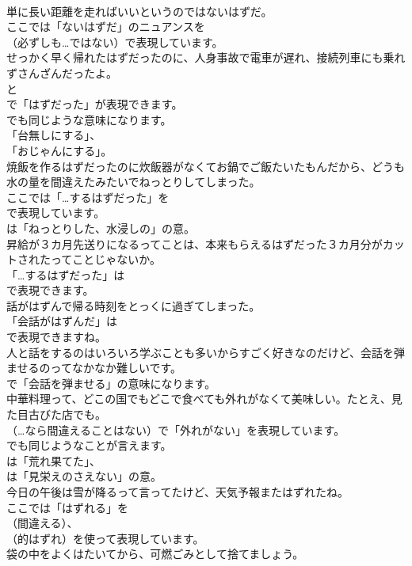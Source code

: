 \documentclass[8pt]{extreport}
\begin{document}
\begin{CJK}{UTF8}{min}
\\	単に長い距離を走ればいいというのではないはずだ。 
\\	ここでは「ないはずだ」のニュアンスを 
\\	（必ずしも…ではない）で表現しています。	
\\	せっかく早く帰れたはずだったのに、人身事故で電車が遅れ、接続列車にも乗れずさんざんだったよ。 
\\	と
\\	で「はずだった」が表現できます。
\\	でも同じような意味になります。
\\	「台無しにする」、
\\	「おじゃんにする」。	
\\	焼飯を作るはずだったのに炊飯器がなくてお鍋でご飯たいたもんだから、どうも水の量を間違えたみたいでねっとりしてしまった。 
\\	ここでは「…するはずだった」を 
\\	で表現しています。
\\	は「ねっとりした、水浸しの」の意。	
\\	昇給が３カ月先送りになるってことは、本来もらえるはずだった３カ月分がカットされたってことじゃないか。 
\\	「…するはずだった」は 
\\	で表現できます。	
\\	話がはずんで帰る時刻をとっくに過ぎてしまった。 
\\	「会話がはずんだ」は
\\	で表現できますね。	
\\	人と話をするのはいろいろ学ぶことも多いからすごく好きなのだけど、会話を弾ませるのってなかなか難しいです。 
\\	で「会話を弾ませる」の意味になります。	
\\	中華料理って、どこの国でもどこで食べても外れがなくて美味しい。たとえ、見た目古びた店でも。 
\\	（…なら間違えることはない）で「外れがない」を表現しています。
\\	でも同じようなことが言えます。
\\	は「荒れ果てた」、
\\	は「見栄えのさえない」の意。	
\\	今日の午後は雪が降るって言ってたけど、天気予報またはずれたね。 
\\	ここでは「はずれる」を
\\	（間違える）、
\\	（的はずれ）を使って表現しています。	
\\	袋の中をよくはたいてから、可燃ごみとして捨てましょう。 

\end{CJK}
\end{document}
